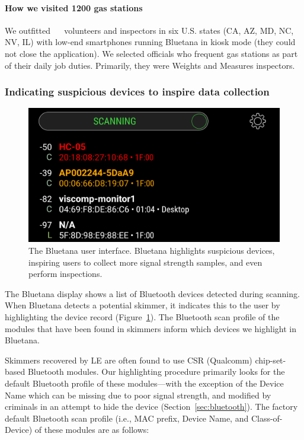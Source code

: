 \paragraph{How we visited 1200 gas stations}
%
We outfitted ~\numvolunteers~ volunteers and inspectors in six U.S. states (CA, AZ, MD, NC,
NV, IL) with low-end smartphones running Bluetana in kiosk mode (they could not
close the application).
%
We selected officials who frequent gas stations as part of their daily job
duties. Primarily, they were Weights and Measures inspectors.
%

\subsubsection*{Indicating suspicious devices to inspire data collection}

\begin{figure}
\centering
\includegraphics[width=0.8\linewidth]{skimmer/fig/bluetana_screenshot}
\caption{
\label{fig:bluetana}
The Bluetana user interface. Bluetana highlights suspicious devices, inspiring users to collect more
signal strength samples, and even perform inspections.
}
\end{figure}



The Bluetana display shows a list of Bluetooth devices detected during scanning.
%
When Bluetana detects a potential skimmer, it indicates this to the user by
highlighting the device record (Figure~\ref{fig:bluetana}).
%
The Bluetooth scan profile of the modules that have been found in skimmers inform which devices we highlight in Bluetana.
 
Skimmers recovered by LE are often found to use CSR (Qualcomm) chip-set-based Bluetooth modules.
%
Our highlighting procedure primarily looks for the default Bluetooth profile of
these modules---with the exception of the Device Name which can be missing due to poor
signal strength, and modified by criminals in an attempt to hide the device (Section~\ref{sec:bluetooth}).
%
The factory default Bluetooth scan profile (i.e., MAC prefix, Device Name, and
Class-of-Device) of these modules are as follows:

